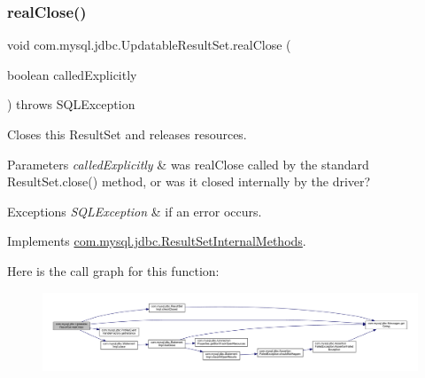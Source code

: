 \subsubsection{\texorpdfstring{real\+Close()}{realClose()}}
{\footnotesize\ttfamily void com.\+mysql.\+jdbc.\+Updatable\+Result\+Set.\+real\+Close (\begin{DoxyParamCaption}\item[{boolean}]{called\+Explicitly }\end{DoxyParamCaption}) throws S\+Q\+L\+Exception}

Closes this Result\+Set and releases resources.


\begin{DoxyParams}{Parameters}
{\em called\+Explicitly} & was real\+Close called by the standard Result\+Set.\+close() method, or was it closed internally by the driver?\\
\hline
\end{DoxyParams}

\begin{DoxyExceptions}{Exceptions}
{\em S\+Q\+L\+Exception} & if an error occurs. \\
\hline
\end{DoxyExceptions}


Implements \mbox{\hyperlink{interfacecom_1_1mysql_1_1jdbc_1_1_result_set_internal_methods_a04e640b79d91cb9a0eefecf583740187}{com.\+mysql.\+jdbc.\+Result\+Set\+Internal\+Methods}}.

Here is the call graph for this function\+:
\nopagebreak
\begin{figure}[H]
\begin{center}
\leavevmode
\includegraphics[width=350pt]{classcom_1_1mysql_1_1jdbc_1_1_updatable_result_set_a56e7da4266eef885ba3dfc5005e30525_cgraph}
\end{center}
\end{figure}
\mbox{\label{classcom_1_1mysql_1_1jdbc_1_1_updatable_result_set_a7152d037ea38ea45e9cadccd9c9c2639}} 
